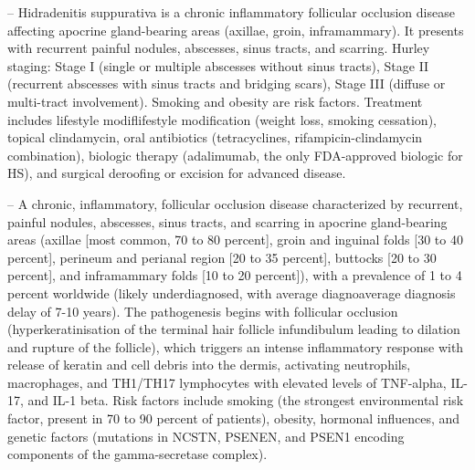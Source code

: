 -- Hidradenitis suppurativa is a chronic inflammatory follicular occlusion disease affecting apocrine gland-bearing areas (axillae, groin, inframammary). It presents with recurrent painful nodules, abscesses, sinus tracts, and scarring. Hurley staging: Stage I (single or multiple abscesses without sinus tracts), Stage II (recurrent abscesses with sinus tracts and bridging scars), Stage III (diffuse or multi-tract involvement). Smoking and obesity are risk factors. Treatment includes lifestyle modiflifestyle modification (weight loss, smoking cessation), topical clindamycin, oral antibiotics (tetracyclines, rifampicin-clindamycin combination), biologic therapy (adalimumab, the only FDA-approved biologic for HS), and surgical deroofing or excision for advanced disease.

-- A chronic, inflammatory, follicular occlusion disease characterized by recurrent, painful nodules, abscesses, sinus tracts, and scarring in apocrine gland-bearing areas (axillae [most common, 70 to 80 percent], groin and inguinal folds [30 to 40 percent], perineum and perianal region [20 to 35 percent], buttocks [20 to 30 percent], and inframammary folds [10 to 20 percent]), with a prevalence of 1 to 4 percent worldwide (likely underdiagnosed, with average diagnoaverage diagnosis delay of 7-10 years). The pathogenesis begins with follicular occlusion (hyperkeratinisation of the terminal hair follicle infundibulum leading to dilation and rupture of the follicle), which triggers an intense inflammatory response with release of keratin and cell debris into the dermis, activating neutrophils, macrophages, and TH1/TH17 lymphocytes with elevated levels of TNF-alpha, IL-17, and IL-1 beta. Risk factors include smoking (the strongest environmental risk factor, present in 70 to 90 percent of patients), obesity, hormonal influences, and genetic factors (mutations in NCSTN, PSENEN, and PSEN1 encoding components of the gamma-secretase complex).

